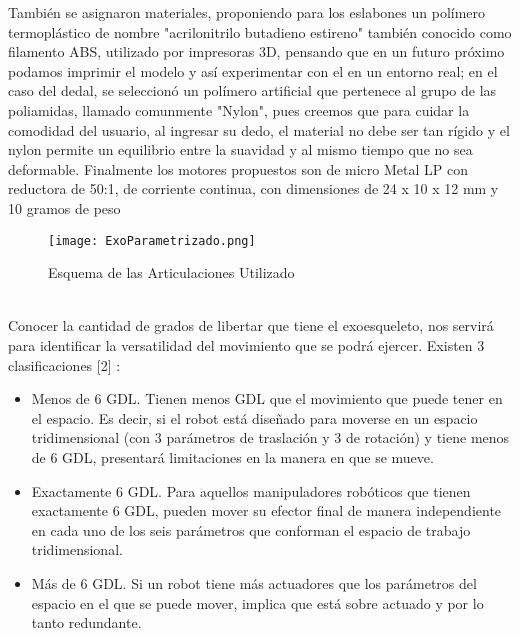 También se asignaron materiales, proponiendo para los eslabones un polímero termoplástico de nombre "acrilonitrilo
butadieno estireno" también conocido como filamento ABS, utilizado por impresoras 3D, pensando que en un futuro próximo
podamos imprimir el modelo y así experimentar con el en un entorno real; en el caso del dedal, se seleccionó un polímero artificial que pertenece al grupo de las poliamidas, llamado comunmente "Nylon", pues creemos que para cuidar la comodidad del usuario, al ingresar su dedo, el material no debe ser tan rígido y el nylon permite un equilibrio entre la suavidad y al mismo tiempo que no sea deformable.
Finalmente los motores propuestos son de micro Metal LP con reductora de 50:1, de corriente continua, con dimensiones
de 24 x 10 x 12 mm y 10 gramos de peso \\ 
\begin{figure} [h!]
            \centering
            \texttt{[image: ExoParametrizado.png]}
        \caption{Esquema de las Articulaciones Utilizado}
        \label{fig:ExoPara}
\end{figure}
\noindent  \\
Conocer la cantidad de grados de libertar que tiene el exoesqueleto, nos servirá para identificar la versatilidad del
movimiento que se podrá ejercer. Existen 3 clasificaciones [2] :
\begin{itemize}
    \item Menos de 6 GDL. Tienen menos GDL que el movimiento que puede tener en el espacio. Es decir, si el robot está
    diseñado para moverse en un espacio tridimensional (con 3 parámetros de traslación y 3 de rotación) y tiene menos
    de 6 GDL, presentará  limitaciones en la manera en que se mueve. 
    \item Exactamente 6 GDL. Para aquellos manipuladores robóticos que tienen exactamente 6 GDL, pueden mover su efector
    final de manera independiente en cada uno de los seis parámetros que conforman el espacio de trabajo tridimensional.
    \item Más de 6 GDL. Si un robot tiene más actuadores que los parámetros del espacio en el que se puede mover,
    implica que está sobre actuado y por lo tanto redundante.
\end{itemize}
